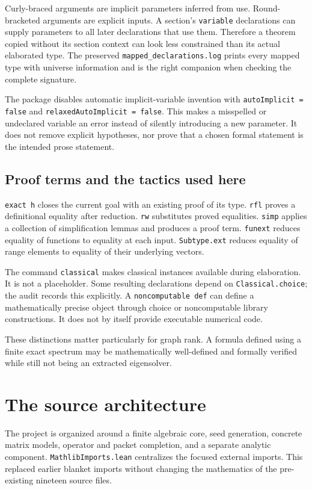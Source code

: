 \documentclass[11pt,a4paper]{article}
\newcommand{\code}[1]{\nolinkurl{#1}}
\begin{document}
Curly-braced arguments are implicit parameters inferred from use. Round-bracketed arguments are explicit inputs. A section's \code{variable} declarations can supply parameters to all later declarations that use them. Therefore a theorem copied without its section context can look less constrained than its actual elaborated type. The preserved \code{mapped_declarations.log} prints every mapped type with universe information and is the right companion when checking the complete signature.

The package disables automatic implicit-variable invention with \code{autoImplicit = false} and \code{relaxedAutoImplicit = false}. This makes a misspelled or undeclared variable an error instead of silently introducing a new parameter. It does not remove explicit hypotheses, nor prove that a chosen formal statement is the intended prose statement.

\subsection{Proof terms and the tactics used here}

\code{exact h} closes the current goal with an existing proof of its type. \code{rfl} proves a definitional equality after reduction. \code{rw} substitutes proved equalities. \code{simp} applies a collection of simplification lemmas and produces a proof term. \code{funext} reduces equality of functions to equality at each input. \code{Subtype.ext} reduces equality of range elements to equality of their underlying vectors.

The command \code{classical} makes classical instances available during elaboration. It is not a placeholder. Some resulting declarations depend on \code{Classical.choice}; the audit records this explicitly. A \code{noncomputable def} can define a mathematically precise object through choice or noncomputable library constructions. It does not by itself provide executable numerical code.

These distinctions matter particularly for graph rank. A formula defined using a finite exact spectrum may be mathematically well-defined and formally verified while still not being an extracted eigensolver.

\section{The source architecture}

The project is organized around a finite algebraic core, seed generation, concrete matrix models, operator and packet completion, and a separate analytic component. \code{MathlibImports.lean} centralizes the focused external imports. This replaced earlier blanket imports without changing the mathematics of the pre-existing nineteen source files.
\end{document}
